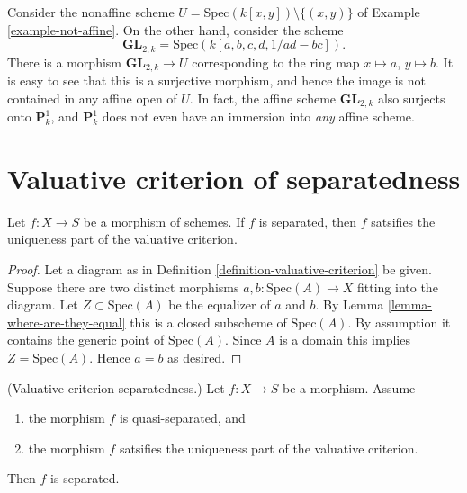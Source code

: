 \begin{example}
\label{example-image-affine-projective}
Consider the nonaffine scheme
$U = \text{Spec}(k[x, y]) \setminus \{(x, y)\}$ of
Example \ref{example-not-affine}. On the other hand, consider the
scheme
$$
\mathbf{GL}_{2, k} = \text{Spec}(k[a, b, c, d, 1/ad - bc]).
$$
There is a morphism $\mathbf{GL}_{2, k} \to U$ corresponding
to the ring map $x \mapsto a$, $y \mapsto b$. It is easy to see that
this is a surjective morphism, and hence the image is not contained
in any affine open of $U$. In fact, the affine scheme
$\mathbf{GL}_{2, k}$ also surjects onto $\mathbf{P}^1_k$, and
$\mathbf{P}^1_k$ does not even have an immersion into {\it any} affine scheme.
\end{example}








\section{Valuative criterion of separatedness}
\label{section-valuative-separatedness}

\begin{lemma}
\label{lemma-separated-implies-valuative}
Let $f : X \to S$ be a morphism of schemes.
If $f$ is separated, then $f$ satsifies the uniqueness
part of the valuative criterion.
\end{lemma}

\begin{proof}
Let a diagram as in Definition \ref{definition-valuative-criterion}
be given. Suppose there are two distinct morphisms
$a, b : \text{Spec}(A) \to X$ fitting into the diagram.
Let $Z \subset \text{Spec}(A)$ be the equalizer of $a$ and $b$.
By Lemma \ref{lemma-where-are-they-equal} this is a closed
subscheme of $\text{Spec}(A)$. By assumption it contains
the generic point of $\text{Spec}(A)$. Since $A$ is a domain
this implies $Z = \text{Spec}(A)$. Hence $a = b$ as desired.
\end{proof}

\begin{lemma}
\label{lemma-valuative-criterion-separatedness}
(Valuative criterion separatedness.)
Let $f : X \to S$ be a morphism.
Assume
\begin{enumerate}
\item the morphism $f$ is quasi-separated, and
\item the morphism $f$ satsifies the uniqueness
part of the valuative criterion.
\end{enumerate}
Then $f$ is separated.
\end{lemma}

